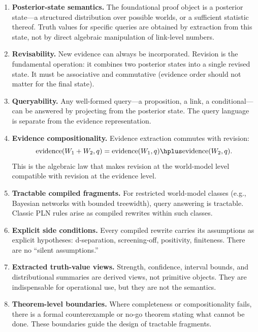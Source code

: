 \documentclass[11pt,openany]{report}
\begin{document}
\begin{enumerate}
\item \textbf{Posterior-state semantics.}  The foundational proof object is a
  posterior state---a structured distribution over possible worlds, or a
  sufficient statistic thereof.  Truth values for specific queries are
  obtained by extraction from this state, not by direct algebraic manipulation
  of link-level numbers.

\item \textbf{Revisability.}  New evidence can always be incorporated.
  Revision is the fundamental operation: it combines two posterior states
  into a single revised state.  It must be associative and commutative
  (evidence order should not matter for the final state).

\item \textbf{Queryability.}  Any well-formed query---a proposition, a link,
  a conditional---can be answered by projecting from the posterior state.
  The query language is separate from the evidence representation.

\item \textbf{Evidence compositionality.}  Evidence extraction commutes with
  revision:
  \[
    \mathrm{evidence}(W_1 + W_2, q) = \mathrm{evidence}(W_1, q) \hplus
    \mathrm{evidence}(W_2, q).
  \]
  This is the algebraic law that makes revision at the world-model level
  compatible with revision at the evidence level.

\item \textbf{Tractable compiled fragments.}  For restricted world-model
  classes (e.g., Bayesian networks with bounded treewidth), query answering
  is tractable.  Classic PLN rules arise as compiled rewrites within such
  classes.

\item \textbf{Explicit side conditions.}  Every compiled rewrite carries its
  assumptions as explicit hypotheses: d-separation, screening-off, positivity,
  finiteness.  There are no ``silent assumptions.''

\item \textbf{Extracted truth-value views.}  Strength, confidence, interval
  bounds, and distributional summaries are derived views, not primitive
  objects.  They are indispensable for operational use, but they are not the
  semantics.

\item \textbf{Theorem-level boundaries.}  Where completeness or compositionality
  fails, there is a formal counterexample or no-go theorem stating what
  cannot be done.  These boundaries guide the design of tractable fragments.
\end{enumerate}
\end{document}

